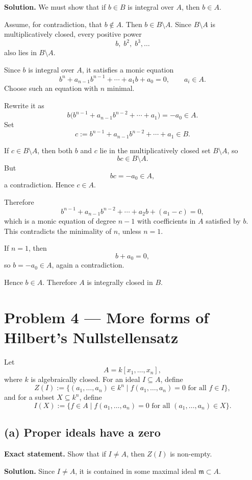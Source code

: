 \documentclass[12pt,a4paper]{article}
\theoremstyle{notespace}
\begin{document}
\textbf{Solution.}
We must show that if \(b\in B\) is integral over \(A\), then \(b\in A\).

Assume, for contradiction, that \(b\notin A\). Then \(b\in B\setminus A\). Since \(B\setminus A\) is multiplicatively closed, every positive power
\[
b,\;b^2,\;b^3,\dots
\]
also lies in \(B\setminus A\).

Since \(b\) is integral over \(A\), it satisfies a monic equation
\[
b^n+a_{n-1}b^{n-1}+\cdots+a_1b+a_0=0,
\qquad a_i\in A.
\]
Choose such an equation with \(n\) minimal.

Rewrite it as
\[
b\bigl(b^{n-1}+a_{n-1}b^{n-2}+\cdots+a_1\bigr)=-a_0\in A.
\]
Set
\[
c:=b^{n-1}+a_{n-1}b^{n-2}+\cdots+a_1\in B.
\]

If \(c\in B\setminus A\), then both \(b\) and \(c\) lie in the multiplicatively closed set \(B\setminus A\), so
\[
bc\in B\setminus A.
\]
But
\[
bc=-a_0\in A,
\]
a contradiction. Hence \(c\in A\).

Therefore
\[
b^{n-1}+a_{n-1}b^{n-2}+\cdots+a_2b+(a_1-c)=0,
\]
which is a monic equation of degree \(n-1\) with coefficients in \(A\) satisfied by \(b\). This contradicts the minimality of \(n\), unless \(n=1\).

If \(n=1\), then
\[
b+a_0=0,
\]
so \(b=-a_0\in A\), again a contradiction.

Hence \(b\in A\). Therefore \(A\) is integrally closed in \(B\).

\bigskip

\section{Problem 4 --- More forms of Hilbert's Nullstellensatz}

Let
\[
A=k[x_1,\dots,x_n],
\]
where \(k\) is algebraically closed. For an ideal \(I\subseteq A\), define
\[
Z(I):=\{(a_1,\dots,a_n)\in k^n\mid f(a_1,\dots,a_n)=0\text{ for all }f\in I\},
\]
and for a subset \(X\subseteq k^n\), define
\[
I(X):=\{f\in A\mid f(a_1,\dots,a_n)=0\text{ for all }(a_1,\dots,a_n)\in X\}.
\]

\subsection*{(a) Proper ideals have a zero}

\textbf{Exact statement.}
Show that if \(I\neq A\), then \(Z(I)\) is non-empty.

\textbf{Solution.}
Since \(I\neq A\), it is contained in some maximal ideal \(\mathfrak m\subset A\).
\end{document}
